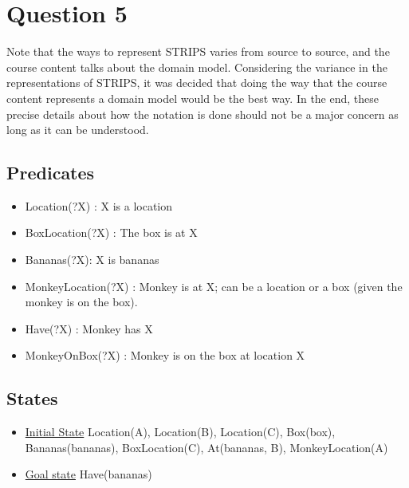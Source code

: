 \documentclass{article}
\newcommand\tab[1][1cm]{\hspace*{#1}}
\begin{document}
\section*{Question 5}
Note that the ways to represent STRIPS varies from source to source, and the
course content talks about the domain model. Considering the variance in the
representations of STRIPS, it was decided that doing the way that the course
content represents a domain model would be the best way. In the end, these
precise details about how the notation is done should not be a major concern as
long as it can be understood.
\subsection*{Predicates}
\begin{itemize}
    \item Location(?X) : X is a location
    \item BoxLocation(?X) : The box is at X
    \item Bananas(?X): X is bananas
    \item MonkeyLocation(?X) : Monkey is at X; can be a location or a box (given
    the monkey is on the box).
    \item Have(?X) : Monkey has X
    \item MonkeyOnBox(?X) : Monkey is on the box at location X
\end{itemize}
\subsection*{States}
\begin{itemize}
    \item \underline{Initial State} Location(A), Location(B), Location(C),
        Box(box), Bananas(bananas), BoxLocation(C), At(bananas, B),  
        MonkeyLocation(A) 
    \item \underline{Goal state} Have(bananas)
\end{itemize}
\end{document}

